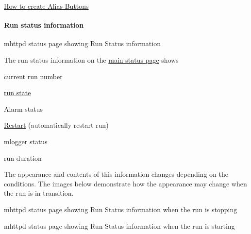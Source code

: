 \begin{DoxyItemize}
\item \hyperlink{RC_mhttpd_Alias_page_RC_mhttpd_alias_define}{How to create Alias-\/Buttons}
\end{DoxyItemize}

\par


\par
\hypertarget{RC_mhttpd_status_page_features_RC_mhttpd_status_Run_info}{}\paragraph{Run status information}\label{RC_mhttpd_status_page_features_RC_mhttpd_status_Run_info}
\begin{center} mhttpd status page showing Run Status information  \end{center} \par


The run status information on the \hyperlink{RC_mhttpd_Main_Status_page_RC_mhttpd_main_status}{main status page} shows
\begin{DoxyItemize}
\item current run number
\item \hyperlink{RC_mhttpd_status_page_features_RC_table_run_state}{run state}
\item Alarm status
\item \hyperlink{F_Logging_Data_F_Logger_Auto_Restart}{Restart} (automatically restart run)
\item mlogger status
\item run duration
\end{DoxyItemize}

The appearance and contents of this information changes depending on the conditions. The images below demonstrate how the appearance may change when the run is in transition.

\begin{center} mhttpd status page showing Run Status information when the run is stopping  \end{center} \par


\begin{center} mhttpd status page showing Run Status information when the run is starting  \end{center} \par


\par


